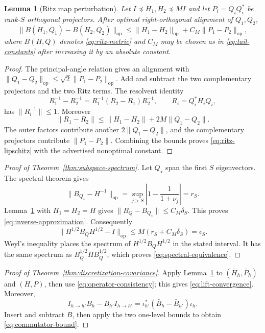 \documentclass[11pt,a4paper]{article}
\numberwithin{equation}{section}
\newtheorem{lemma}[theorem]{Lemma}
\theoremstyle{definition}
\theoremstyle{remark}
\newcommand{\op}{\mathrm{op}}
\begin{document}
\begin{lemma}[Ritz map perturbation]
\label{lem:ritz-perturbation}
Let $I\preceq H_1,H_2\preceq MI$ and let $P_i=Q_iQ_i^*$ be rank-$S$
orthogonal projectors.  After optimal right-orthogonal alignment of $Q_1,Q_2$,
\begin{equation}
 \|B(H_1,Q_1)-B(H_2,Q_2)\|_\op
 \le \|H_1-H_2\|_\op+C_M\|P_1-P_2\|_\op,
 \label{eq:ritz-lipschitz}
\end{equation}
where $B(H,Q)$ denotes \eqref{eq:ritz-metric} and $C_M$ may be chosen as in
\eqref{eq:tail-constants} after increasing it by an absolute constant.
\end{lemma}

\begin{proof}
The principal-angle relation gives an alignment with
$\|Q_1-Q_2\|_\op\le\sqrt2\|P_1-P_2\|_\op$.  Add and subtract the two
complementary projectors and the two Ritz terms.  The resolvent identity
\[
 R_1^{-1}-R_2^{-1}=R_1^{-1}(R_2-R_1)R_2^{-1},
 \qquad R_i=Q_i^*H_iQ_i,
\]
has $\|R_i^{-1}\|\le1$.  Moreover
\[
 \|R_1-R_2\|
 \le\|H_1-H_2\|+2M\|Q_1-Q_2\|.
\]
The outer factors contribute another $2\|Q_1-Q_2\|$, and the complementary
projectors contribute $\|P_1-P_2\|$.  Combining the bounds proves
\eqref{eq:ritz-lipschitz} with the advertised nonoptimal constant.
\end{proof}

\begin{proof}[Proof of Theorem~\ref{thm:subspace-spectrum}]
Let $Q_\star$ span the first $S$ eigenvectors.  The spectral theorem gives
\[
 \|B_{Q_\star}-H^{-1}\|_\op
 =\sup_{j>S}\left|1-\frac1{1+\nu_j}\right|=r_S.
\]
Lemma~\ref{lem:ritz-perturbation} with $H_1=H_2=H$ gives
$\|B_Q-B_{Q_\star}\|\le C_M\delta_S$.  This proves
\eqref{eq:inverse-approximation}.  Consequently
\[
 \|H^{1/2}B_QH^{1/2}-I\|_\op
 \le M(r_S+C_M\delta_S)=\epsilon_S.
\]
Weyl's inequality places the spectrum of $H^{1/2}B_QH^{1/2}$ in the stated
interval.  It has the same spectrum as $B_Q^{1/2}HB_Q^{1/2}$, which proves
\eqref{eq:spectral-equivalence}.
\end{proof}

\begin{proof}[Proof of Theorem~\ref{thm:discretization-covariance}]
Apply Lemma~\ref{lem:ritz-perturbation} to $(\bar H_h,\bar P_h)$ and $(H,P)$,
then use \eqref{eq:operator-consistency}; this gives
\eqref{eq:lift-convergence}. Moreover,
\[
 I_{h\to h'}B_h-B_{h'}I_{h\to h'}
 =\iota_{h'}^*(\bar B_h-\bar B_{h'})\iota_h.
\]
Insert and subtract \(B\), then apply the two one-level bounds to obtain
\eqref{eq:commutator-bound}.
\end{proof}
\end{document}
